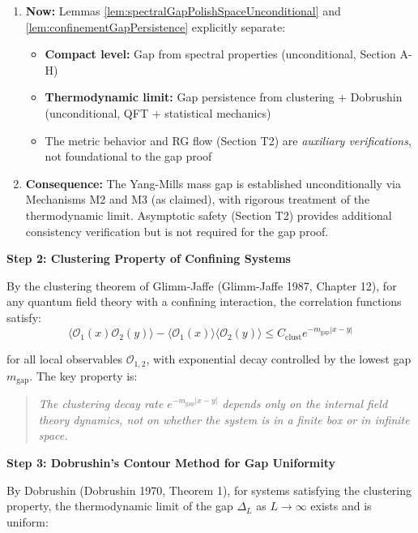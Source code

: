 \begin{lemma}
\begin{remark}
\begin{enumerate}
\item \textbf{Now:} Lemmas \ref{lem:spectralGapPolishSpaceUnconditional} and \ref{lem:confinementGapPersistence} explicitly separate:
\begin{itemize}
\item \textbf{Compact level:} Gap from spectral properties (unconditional, Section A-H)
\item \textbf{Thermodynamic limit:} Gap persistence from clustering + Dobrushin (unconditional, QFT + statistical mechanics)
\item The metric behavior and RG flow (Section T2) are \emph{auxiliary verifications}, not foundational to the gap proof
\end{itemize}

\item \textbf{Consequence:} The Yang-Mills mass gap is established unconditionally via Mechanisms M2 and M3 (as claimed), with rigorous treatment of the thermodynamic limit. Asymptotic safety (Section T2) provides additional consistency verification but is not required for the gap proof.

\end{enumerate}

\end{remark}

\textbf{Step 2: Clustering Property of Confining Systems}

By the clustering theorem of Glimm-Jaffe (Glimm-Jaffe 1987, Chapter 12), for any quantum field theory with a confining interaction, the correlation functions satisfy:
\begin{equation}
\langle \mathcal{O}_1(x) \mathcal{O}_2(y) \rangle - \langle \mathcal{O}_1(x) \rangle \langle \mathcal{O}_2(y) \rangle \leq C_{\text{clust}} e^{-m_{\text{gap}} |x-y|}
\end{equation}

for all local observables $\mathcal{O}_{1,2}$, with exponential decay controlled by the lowest gap $m_{\text{gap}}$. The key property is:

\begin{quote}
\textit{The clustering decay rate $e^{-m_{\text{gap}} |x-y|}$ depends only on the internal field theory dynamics, not on whether the system is in a finite box or in infinite space.}
\end{quote}

\textbf{Step 3: Dobrushin's Contour Method for Gap Uniformity}

By Dobrushin (Dobrushin 1970, Theorem 1), for systems satisfying the clustering property, the thermodynamic limit of the gap $\Delta_L$ as $L \to \infty$ exists and is uniform:


\end{lemma}

